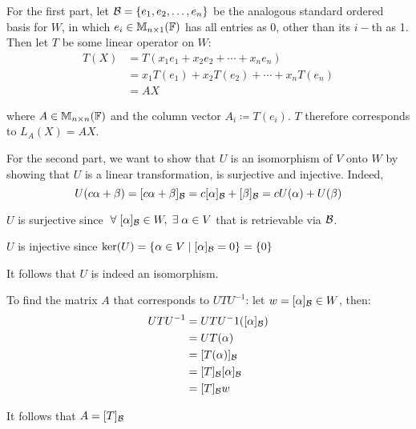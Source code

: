 \documentclass[a4paper, 11pt]{article}
\begin{document}
\begin{solution}
    For the first part, let \(\mathcal{B} = \{e_1, e_2, \dots, e_n\}\) be the analogous standard ordered basis for \(W\), in which \(e_i \in \mathbb{M}_{n \times 1}(\mathbb{F})\) has all entries as 0, other than its \(i-\)th as 1. Then let \(T\) be some linear operator on \(W\):
    \begin{align*}
        T(X) & = T(x_1 e_1 + x_2 e_2 + \cdots + x_n e_n)       \\
             & = x_1 T(e_1) + x_2 T(e_2) + \cdots + x_n T(e_n) \\
             & = AX
    \end{align*}

    where \(A \in \mathbb{M}_{n \times n}(\mathbb{F})\) and the column vector \(A_i \coloneq T(e_i)\). \(T\) therefore corresponds to \(L_A(X) = AX\).

    For the second part, we want to show that \(U\) is an isomorphism of \(V\) onto \(W\) by showing that \(U\) is a linear transformation, is surjective and injective. Indeed, \[
        U(c\alpha + \beta) = [c\alpha+\beta]_{\mathcal{B}} = c[\alpha]_{\mathcal{B}} + [\beta]_{\mathcal{B}} = cU(\alpha) + U(\beta)
    \]

    \(U\) is surjective since \(\forall [\alpha]_\cab \in W, \exists \alpha \in V\) that is retrievable via \(\mathcal{B}\).

    \(U\) is injective since \(\ker(U) = \{\alpha \in V \mid [\alpha]_{\mathcal{B}} = 0\} = \{0\}\)

    It follows that \(U\) is indeed an isomorphism.

    To find the matrix \(A\) that corresponds to \(UTU^{-1}\): let \(w = [\alpha]_{\mathcal{B}} \in W\), then:
    \begin{align*}
        UTU^{-1} & = UTU^-1([\alpha]_{\mathcal{B}})  \\
                 & = UT(\alpha)             \\
                 & = [T(\alpha)]_{\mathcal{B}}       \\
                 & = [T]_{\mathcal{B}} [\alpha]_{\mathcal{B}} \\
                 & = [T]_{\mathcal{B}} w
    \end{align*}

    It follows that \(A = [T]_{\mathcal{B}}\)
\end{solution}
\end{document}
